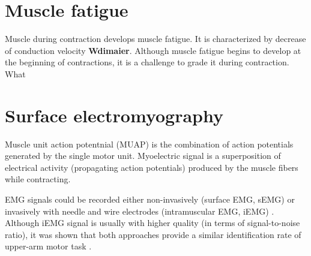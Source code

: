\section{Muscle fatigue}
Muscle during contraction develops muscle fatigue. It is characterized by decrease of conduction velocity \textbf{Wdimaier}. Although muscle fatigue begins to develop at the beginning of contractions, it is a challenge to grade it during contraction. What   


\section{Surface electromyography}

Muscle unit action potentnial (MUAP) is the combination of action potentials generated by the single motor unit.
Myoelectric signal is a superposition of electrical activity (propagating action potentials) produced by the muscle fibers while contracting. 

EMG signals could be recorded either non-invasively (surface EMG, sEMG) or invasively with needle and wire electrodes (intramuscular EMG, iEMG) \citep{Marateb1999}. Although iEMG signal is usually with higher quality (in terms of signal-to-noise ratio), it was shown that both approaches provide a similar identification rate of upper-arm motor task \citep{Hargrove2007}.

